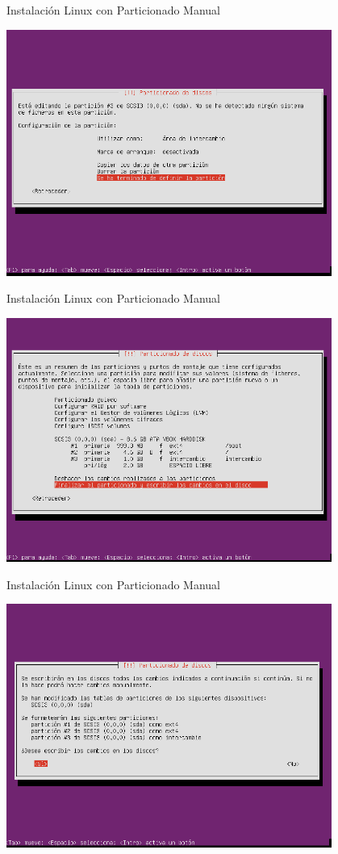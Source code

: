 \begin{frame}{Instalación Linux con Particionado Manual}
 \begin{center}
  \includegraphics[width=0.8\textwidth]{images/install15.png}
 \end{center}
\end{frame}

\begin{frame}{Instalación Linux con Particionado Manual}
 \begin{center}
  \includegraphics[width=0.8\textwidth]{images/install16.png}
 \end{center}
\end{frame}

\begin{frame}{Instalación Linux con Particionado Manual}
 \begin{center}
  \includegraphics[width=0.8\textwidth]{images/install17.png}
 \end{center}
\end{frame}

